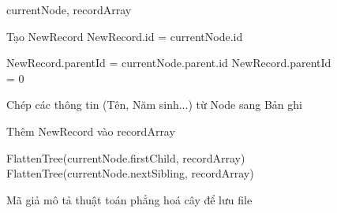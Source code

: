 \begin{figure}[htbp]
	\vspace*{-\baselineskip}
	\centering
	\begin{algorithm}[H]
		\footnotesize
		\caption{Hàm FlattenTree}
		\begin{algorithmic}[1]
			\Require currentNode, recordArray
			
			\State {}
			\Return
			\EndIf
			
			\State {}
			\State Tạo NewRecord
			\State NewRecord.id = currentNode.id
			
			\State NewRecord.parentId = currentNode.parent.id
			\Else
			\State NewRecord.parentId = 0  
			\EndIf
			
			\State Chép các thông tin (Tên, Năm sinh...) từ Node sang Bản ghi
			
			\State {}
			\State Thêm NewRecord vào recordArray
			
			\State {}
			\State FlattenTree(currentNode.firstChild, recordArray)
			\State FlattenTree(currentNode.nextSibling, recordArray)
		\end{algorithmic}
	\end{algorithm}
	\vspace*{-\baselineskip}
	\caption{Mã giả mô tả thuật toán phẳng hoá cây để lưu file}
	\vspace*{-\baselineskip}
\end{figure}
